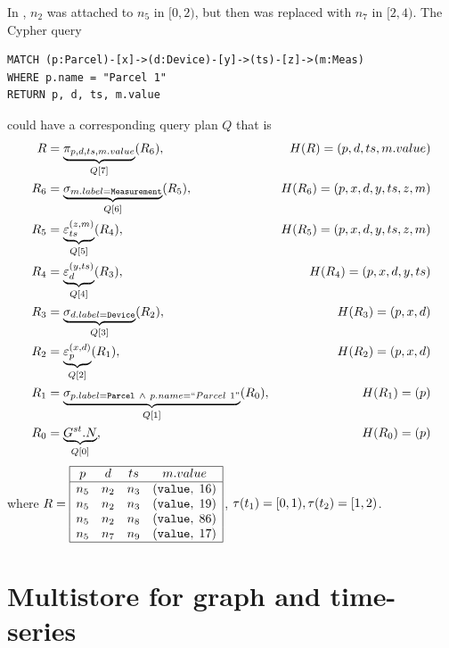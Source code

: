 \begin{example}
In , $n_2$ was attached to $n_5$ in $[0, 2)$, but then was replaced with $n_7$ in $[2, 4)$.
The Cypher query
\begin{lstlisting}
MATCH (p:Parcel)-[x]->(d:Device)-[y]->(ts)-[z]->(m:Meas)
WHERE p.name = "Parcel 1"
RETURN p, d, ts, m.value
\end{lstlisting}
could have a corresponding query plan $Q$ that is
{\small
\[
\begin{aligned}
R &= \underbrace{\pi_{p,d,ts,m.value}}_{Q[7]}(R_6),&H(R) = (p, d, ts, m.value)\\
R_6 &= \underbrace{\sigma_{m.label = \texttt{Measurement}}}_{Q[6]}(R_5),&H(R_6) = (p, x, d, y, ts, z, m)\\
R_5 &= \underbrace{\varepsilon^{(z,m)}_{ts}}_{Q[5]}(R_4),&H(R_5) = (p, x, d, y, ts, z, m)\\
R_4 &= \underbrace{\varepsilon^{(y,ts)}_d}_{Q[4]}(R_3),&H(R_4) = (p, x, d, y, ts)\\
R_3 &= \underbrace{\sigma_{d.label = \texttt{Device}}}_{Q[3]}(R_2),&H(R_3) = (p, x, d)\\
R_2 &= \underbrace{\varepsilon^{(x,d)}_p}_{Q[2]}(R_1),&H(R_2) = (p, x, d)\\
R_1 &= \underbrace{\sigma_{p.label = \texttt{Parcel}~\land~p.name = ``Parcel~1"}}_{Q[1]}(R_0),&H(R_1) = (p)\\
R_0 &= \underbrace{G^{st}.N}_{Q[0]},&H(R_0) = (p)
\end{aligned}
\]
\noindent where
$R=\begin{array}{|cccc|}
\hline
p & d & ts & m.value \\
\hline
n_5 & n_2 & n_3 & (\texttt{value},\;16) \\
n_5 & n_2 & n_3 & (\texttt{value},\;19) \\
n_5 & n_2 & n_8 & (\texttt{value},\;86) \\
n_5 & n_7 & n_9 & (\texttt{value},\;17) \\
\hline
\end{array}
$, $\tau(t_1)=[0,1), \tau(t_2)=[1,2)$.
}
\end{example}

\section{Multistore for graph and time-series}\label{sec:stgraph}

